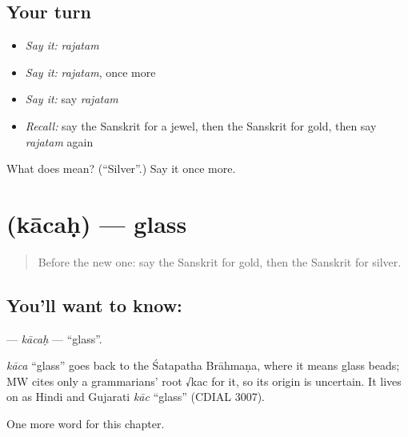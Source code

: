 \subsection*{Your turn}
\begin{itemize}
\raggedright
  \item \emph{Say it:} \emph{rajatam}
  \item \emph{Say it:} \emph{rajatam}, once more
  \item \emph{Say it:} say \emph{rajatam}
  \item \emph{Recall:} say the Sanskrit for a jewel, then the Sanskrit for gold, then say \emph{rajatam} again
\end{itemize}

\begin{tcolorbox}[breakable,colback=teal!4,colframe=teal!35!black,title={Before you move on}]
What does  mean? (\textquotedblleft{}Silver\textquotedblright{}.) Say it once more.
\end{tcolorbox}
\section[\texorpdfstring{\sk{काचः} (kācaḥ)}{काचः (kācaḥ)}]{ (kācaḥ) — glass}

\label{lesson:SA-C122-kacah}



\begin{quote}
Before the new one: say the Sanskrit for gold, then the Sanskrit for silver.
\end{quote}

\subsection*{You'll want to know: }
\textbf{} — \emph{kācaḥ} — \textquotedblleft{}glass\textquotedblright{}.

\begin{cousinweb}
\emph{kāca} \textquotedblleft{}glass\textquotedblright{} goes back to the Śatapatha Brāhmaṇa, where it means glass beads; MW cites only a grammarians' root √kac for it, so its origin is uncertain. It lives on as Hindi and Gujarati \emph{kāc} \textquotedblleft{}glass\textquotedblright{} (CDIAL 3007).
\end{cousinweb}

\begin{grammarlens}[title={What you've built}]
One more word for this chapter.
\end{grammarlens}


